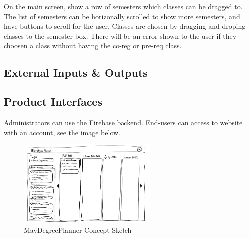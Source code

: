On the main screen, show a row of semesters which classes can be dragged to.
The list of semesters can be horizonally scrolled to show more semesters, and
have buttons to scroll for the user.
Classes are chosen by dragging and droping classes to the semester box.
There will be an error shown to the user if they choosen a class
without having the co-reg or pre-req class.

\subsection{External Inputs \& Outputs}

\begin{table}[h]
    \caption{Overview of external inputs and outputs}
\end{table}

\subsection{Product Interfaces}

Administrators can use the Firebase backend. End-users can access to website
with an account, see the image below.

\begin{figure}[h!]
    \centering
    \includegraphics[width=0.60\textwidth]{images/MavDegreePlannerDiagram-Small}
    \caption{MavDegreePlanner Concept Sketch}
\end{figure}
